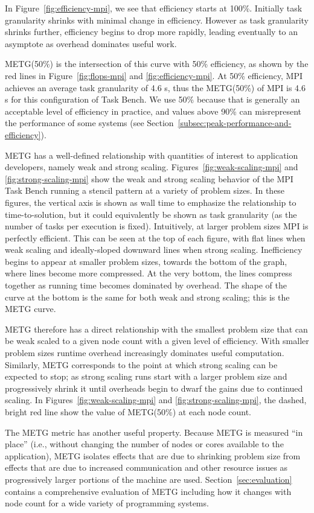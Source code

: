 In Figure~\ref{fig:efficiency-mpi}, we see that
efficiency starts at 100\%. Initially task granularity
shrinks with minimal change in efficiency. However as task
granularity shrinks further, efficiency begins to drop more rapidly, leading
eventually to an asymptote as overhead dominates useful work.


METG(50\%) is the intersection of this curve with 50\% efficiency, as
shown by the red lines in Figure~\ref{fig:flops-mpi} and
\ref{fig:efficiency-mpi}. At 50\% efficiency, MPI achieves an average
task granularity of
4.6 \textmu{}s, thus the METG(50\%) of MPI is 4.6 \textmu{}s for this configuration of
Task Bench. We use 50\% because that is generally an acceptable level
of efficiency in practice, and values above 90\% can misrepresent the
performance of some systems (see
Section~\ref{subsec:peak-performance-and-efficiency}).




METG has a well-defined
relationship with quantities of interest to application developers,
namely weak and strong scaling. Figures~\ref{fig:weak-scaling-mpi} and
\ref{fig:strong-scaling-mpi} show the weak and strong scaling behavior of the MPI Task Bench running a stencil pattern at a variety of problem sizes. In these
figures, the vertical axis is shown as wall time to emphasize the
relationship to time-to-solution, but it could equivalently be shown
as task granularity (as the number of tasks per execution is
fixed). Intuitively, at
larger problem sizes MPI is perfectly efficient. This can be seen at
the top of each figure, with flat lines when weak scaling and
ideally-sloped downward lines when strong scaling. Inefficiency begins
to appear at smaller problem sizes, towards the bottom of the graph,
where lines become more compressed. At the
very bottom, the lines compress together as running time becomes dominated by overhead. The shape of the curve at the bottom is the same
for both weak and strong scaling; this is
the METG curve.

METG therefore has a direct relationship with the smallest problem
size that can be weak scaled to a given node count with a given level
of efficiency. With smaller problem sizes runtime overhead increasingly dominates useful
computation. Similarly, METG corresponds to the point at which strong
scaling can be expected to stop; as strong scaling runs start with a
larger problem size and progressively shrink it until overheads begin
to dwarf the gains due to continued scaling. In
Figures~\ref{fig:weak-scaling-mpi} and \ref{fig:strong-scaling-mpi},
the dashed, bright red line show the value of METG(50\%) at each node
count.

The METG metric has another useful property. Because METG is measured ``in place'' (i.e.,
without changing the number of nodes or cores available to the
application), METG isolates effects that are
due to shrinking problem size from effects that are due to
increased communication and other resource issues as
progressively larger portions of the machine are used. Section~\ref{sec:evaluation} contains a comprehensive evaluation of
METG including how it changes with node count for a wide variety of
programming systems.
